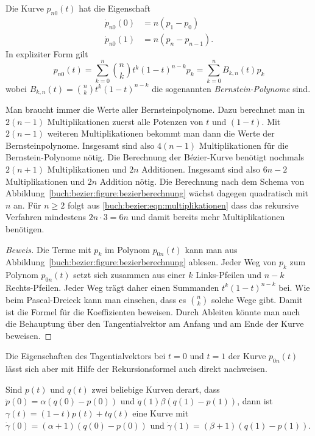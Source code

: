 \begin{satz}
\label{buch:bezier:satz}
Die Kurve $p_{n0}(t)$ hat die Eigenschaft
\begin{align*}
\dot{p}_{n0}(0) &= n (p_1-p_0)
\\
\dot{p}_{n0}(1) &= n (p_n-p_{n-1}).
\end{align*}
In expliziter Form gilt
\[
p_{n0}(t)
=
\sum_{k=0}^n \binom{n}{k} t^k(1-t)^{n-k} p_k
=
\sum_{k=0}^n B_{k,n}(t) p_k
\]
wobei $B_{k,n}(t) = \binom{n}{k}t^k(1-t)^{n-k}$
die sogenannten {\em Bernstein-Polynome} sind.
\end{satz}

Man braucht immer die Werte aller Bernsteinpolynome.
Dazu berechnet man in $2(n-1)$ Multiplikationen zuerst alle
Potenzen von $t$ und $(1-t)$.
Mit $2(n-1)$ weiteren Multiplikationen bekommt man dann die Werte
der Bernsteinpolynome.
Insgesamt sind also $4(n-1)$ Multiplikationen für die Bernstein-Polynome
nötig.
Die Berechnung der Bézier-Kurve benötigt nochmals $2(n+1)$ Multiplikationen
und $2n$ Additionen.
Insgesamt sind also $6n-2$ Multiplikationen und $2n$ Addition nötig.
Die Berechnung nach dem Schema von 
Abbildung~\ref{buch:bezier:figure:bezierberechnung} wächst dagegen 
quadratisch mit $n$ an.
Für $n\ge 2$ folgt aus \eqref{buch:bezier:eqn:multiplikationen}
dass das rekursive Verfahren mindestens $2n\cdot 3=6n$ und damit
bereits mehr Multiplikationen benötigen.

\begin{proof}[Beweis]
Die Terme mit $p_k$ im Polynom $p_{0n}(t)$ kann man aus
Abbildung~\ref{buch:bezier:figure:bezierberechnung} ablesen.
Jeder Weg von $p_k$ zum Polynom $p_{0n}(t)$ setzt sich zusammen aus
einer $k$ Links-Pfeilen und $n-k$ Rechts-Pfeilen.
Jeder Weg trägt daher einen Summanden $t^k(1-t)^{n-k}$ bei.
Wie beim Pascal-Dreieck kann man einsehen, dass es $\binom{n}{k}$
solche Wege gibt.
Damit ist die Formel für die Koeffizienten beweisen.
Durch Ableiten könnte man auch die Behauptung über den Tangentialvektor
am Anfang und am Ende der Kurve beweisen.
\end{proof}

Die Eigenschaften des Tagentialvektors bei $t=0$ und $t=1$
der Kurve $p_{0n}(t)$ lässt sich aber mit Hilfe der Rekursionsformel
auch direkt nachweisen.

\begin{lemma}
Sind $p(t)$ und $q(t)$ zwei beliebige Kurven derart, dass
$\dot{p}(0) = \alpha( q(0)-p(0))$ und $\dot{q}(1) \beta( q(1)-p(1))$,
dann ist
$\gamma(t) = (1-t)p(t) + tq(t)$
eine Kurve mit
$\dot{\gamma}(0)=(\alpha+1)(q(0)-p(0))$
und
$\dot{\gamma}(1)=(\beta+1)(q(1)-p(1))$.
\end{lemma}

